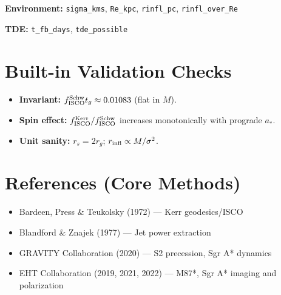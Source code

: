 \documentclass[12pt]{article}
\begin{document}
\textbf{Environment:}  
\texttt{sigma\_kms}, \texttt{Re\_kpc}, \texttt{rinfl\_pc}, \texttt{rinfl\_over\_Re}

\textbf{TDE:}  
\texttt{t\_fb\_days}, \texttt{tde\_possible}

\section{Built-in Validation Checks}
\begin{itemize}
    \item \textbf{Invariant:} $f_{\rm ISCO}^{\rm Schw} t_g \approx 0.01083$ (flat in $M$).
    \item \textbf{Spin effect:} $f_{\rm ISCO}^{\rm Kerr}/f_{\rm ISCO}^{\rm Schw}$ increases monotonically with prograde $a_*$.
    \item \textbf{Unit sanity:} $r_s = 2r_g$; $r_{\rm infl} \propto M/\sigma^2$.
\end{itemize}

\section*{References (Core Methods)}
\begin{itemize}
    \item Bardeen, Press \& Teukolsky (1972) --- Kerr geodesics/ISCO
    \item Blandford \& Znajek (1977) --- Jet power extraction
    \item GRAVITY Collaboration (2020) --- S2 precession, Sgr A* dynamics
    \item EHT Collaboration (2019, 2021, 2022) --- M87*, Sgr A* imaging and polarization
\end{itemize}
\end{document}

